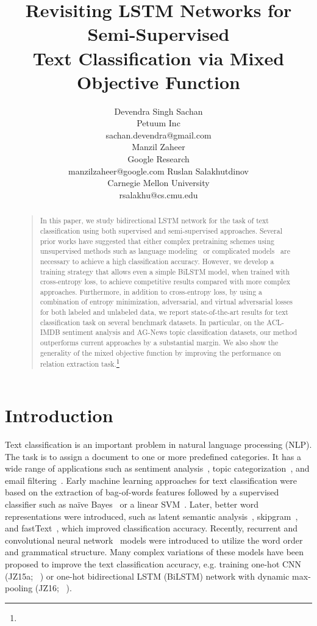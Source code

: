 \documentclass[letterpaper]{article}
\title{Revisiting LSTM Networks for Semi-Supervised \\Text Classification via Mixed Objective Function}
\author{Devendra Singh Sachan\\
Petuum Inc\\
{sachan.devendra@gmail.com}\\
\And
Manzil Zaheer\\
Google Research\\
{manzilzaheer@google.com}
\And
Ruslan Salakhutdinov\\
Carnegie Mellon University\\
{rsalakhu@cs.cmu.edu}
}
\newcommand{\citep}{\cite}
\newcommand{\citealp}[1]{\citeauthor{#1} \citeyear{#1}}
\begin{document}
\maketitle

\begin{abstract}
\begin{quote}
    In this paper, we study bidirectional LSTM network for the task of text classification using both supervised and semi-supervised approaches. Several prior works have suggested that either complex pretraining schemes using unsupervised methods such as language modeling~\citep{dai2015semi,miyato2016adversarial} or complicated models~\citep{johnson2017deep} are necessary to achieve a high classification accuracy. However, we develop a training strategy that allows even a simple BiLSTM model, when trained with cross-entropy loss, to achieve competitive results compared with more complex approaches. Furthermore, in addition to cross-entropy loss, by using a combination of entropy minimization, adversarial, and virtual adversarial losses for both labeled and unlabeled data, we report state-of-the-art results for text classification task on several benchmark datasets. In particular, on the ACL-IMDB sentiment analysis and AG-News topic classification datasets, our method outperforms current approaches by a substantial margin. We also show the generality of the mixed objective function by improving the performance on relation extraction task.\footnote{\mycodeurl}
\end{quote}
\end{abstract}

\section{Introduction}
Text classification is an important problem in natural language processing (NLP). The task is to assign a document to one or more predefined categories. It has a wide range of applications such as sentiment analysis~\citep{pang2008opinion}, topic categorization~\citep{lewis2004rcv1}, and email filtering~\citep{sahami98bayesian}. Early machine learning approaches for text classification were based on the extraction of bag-of-words features followed by a supervised classifier such as na\"ive Bayes~\citep{mccallum1998comparison} or a linear SVM~\citep{joachims1998text}. Later, better word representations were introduced, such as latent semantic analysis~\citep{Deerwester90indexingby}, skipgram~\citep{mikolov2013distributed}, and fastText~\citep{joulin2017fastText}, which improved classification accuracy. Recently, recurrent and convolutional neural network~\citep{kim2014convolutional} models were introduced to utilize the word order and grammatical structure. Many complex variations of these models have been proposed to improve the text classification accuracy, e.g. training one-hot CNN (JZ15a;~\citealp{johnson2015effective}) or one-hot bidirectional LSTM (BiLSTM) network with dynamic max-pooling (JZ16;~\citealp{johnson2016supervised}).
\end{document}
